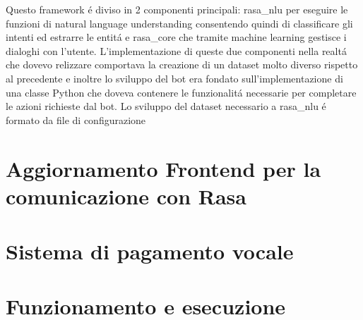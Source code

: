 Questo framework \'e diviso in 2 componenti principali: rasa\_nlu per eseguire le funzioni di natural language understanding consentendo quindi di classificare gli intenti ed estrarre le entit\'a e rasa\_core che tramite machine learning gestisce i dialoghi con l'utente. 
L'implementazione di queste due componenti nella realt\'a che dovevo relizzare comportava la creazione di un dataset molto diverso rispetto al precedente e inoltre lo sviluppo del bot era fondato sull'implementazione di una classe Python che doveva contenere le funzionalit\'a necessarie per completare le azioni richieste dal bot.
Lo sviluppo del dataset necessario a rasa\_nlu \'e formato da file di configurazione 


\section{Aggiornamento Frontend per la comunicazione con Rasa}

\section{Sistema di pagamento vocale}

\section{Funzionamento e esecuzione}

